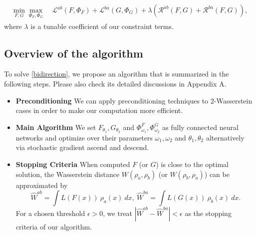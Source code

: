 \documentclass{article}
\begin{document}
\begin{align}
  \label{bidirection}
  \begin{split}
  \min_{ {F}, {G} }\max_{\Phi_F,\Phi_G} ~& \mathcal{L}^{ab}({F}, \Phi_F) + \mathcal{L}^{ba}({G}, \Phi_G) + \lambda(\mathcal{R}^{ab}({F}, {G}) + \mathcal{R}^{ba}({F}, {G})),
  \end{split}
\end{align}
where $\lambda$ is a tunable coefficient of our constraint terms. 

\subsection{Overview of the algorithm}
To solve \eqref{bidirection}, we propose an algorithm that is summarized in the following steps. Please also check its detailed discussions in Appendix A.
\begin{itemize}[leftmargin=*]
  \item \textbf{Preconditioning}  We can apply preconditioning techniques to 2-Wasserstein cases in order to make our computation more efficient.
  \item \textbf{Main Algorithm} We set ${F}_{\theta_1}, {G}_{\theta_2}$ and $\Phi^F_{\omega_1},\Phi^G_{\omega_2}$ as fully connected neural networks and optimize over their parameters $\omega_1,\omega_2$ and $\theta_1,\theta_2$ alternatively via stochastic gradient ascend and descend.
    \item \textbf{Stopping Criteria} When computed ${F}$ (or ${G}$) is close to the optimal solution, the Wasserstein distance $W(\rho_a,\rho_b)$ (or $W(\rho_b, \rho_a)$) can be approximated by %
    \begin{equation*}
      \widehat{W}^{ab} = \int L({F}(x))~\rho_a(x)~dx,  ~ \widehat{W}^{ba} = \int L({G}(x))~\rho_b(x)~dx.
    \end{equation*}
    For a chosen threshold $\epsilon>0$, we treat $|\widehat{W}^{ab} - \widehat{W}^{ba}|<\epsilon$ as the stopping criteria of our algorithm.
\end{itemize}
\end{document}
